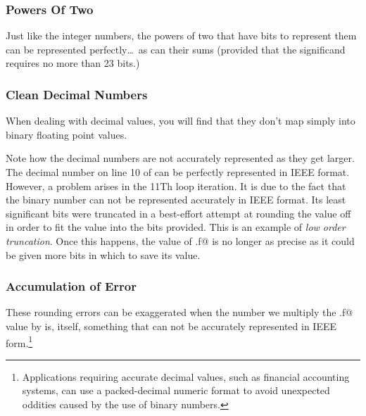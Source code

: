 \subsubsection{Powers Of Two}
Just like the integer numbers, the powers of two that have bits to represent 
them can be represented perfectly\ldots\ as can their sums (provided that the
significand requires no more than 23 bits.)


\subsubsection{Clean Decimal Numbers}
When dealing with decimal values, you will find that they don't map simply
into binary floating point values.

Note how the decimal numbers are not accurately represented as they get larger.
The decimal number on line 10 of 
can be perfectly represented in IEEE format.  However, a problem arises in 
the 11Th loop iteration.  It is due to the fact that the
binary number can not be represented accurately in IEEE format.  Its least
significant bits were truncated in a best-effort attempt at rounding the value
off in order to fit the value into the bits provided.  This is an example of
{\em low order truncation}.  Once this happens, the value of \verb@x.f@ is
no longer as precise as it could be given more bits in which to save its value.


\subsubsection{Accumulation of Error}
These  rounding errors can be exaggerated when the number we multiply 
the \verb@x.f@ value by is, itself, something that can not be accurately 
represented in IEEE 
form.\footnote{Applications requiring accurate decimal values, such as 
financial accounting systems, can use a packed-decimal numeric format
to avoid unexpected oddities caused by the use of binary numbers.}

